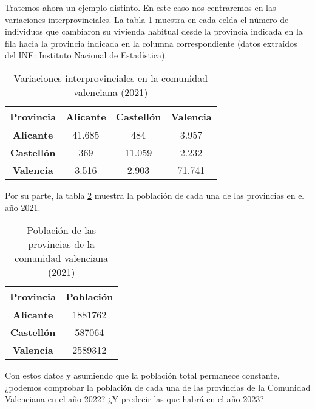 \begin{ejemplo}
    Tratemos ahora un ejemplo distinto. En este caso nos centraremos en las variaciones interprovinciales. La tabla \ref{tab:variaciones} muestra en cada celda el número de individuos que cambiaron su vivienda habitual desde la provincia indicada en la fila hacia la provincia indicada en la columna correspondiente (datos extraídos del INE: Instituto Nacional de Estadística).

    \begin{table}[h]
        \centering
        \begin{tabular}{cccc}\hline
            \textbf{Provincia} & \textbf{Alicante} & \textbf{Castellón} & \textbf{Valencia} \\ \hline\hline
        \textbf{Alicante}                  & 41.685                    & 484                         & 3.957                      \\ \hline
        \textbf{Castellón}                & 369                       & 11.059                      & 2.232                      \\ \hline
        \textbf{Valencia}                & 3.516                     & 2.903                       & 71.741 \\ \hline            
        \end{tabular}
        \caption{Variaciones interprovinciales en la comunidad valenciana (2021)}
        \label{tab:variaciones}
        \end{table}

        Por su parte, la tabla \ref{tab:poblacion} muestra la población de cada una de las provincias en el año 2021. 

        \begin{table}[h]
            \centering
            \begin{tabular}{cc}\hline
                \textbf{Provincia}  & \textbf{Población} \\ \hline\hline
                \textbf{Alicante} &  1881762 \\ \hline
                \textbf{Castellón} & 587064 \\ \hline
                \textbf{Valencia} & 2589312 \\ \hline
            \end{tabular}
            \caption{Población de las provincias de la comunidad valenciana (2021)}
            \label{tab:poblacion}
        \end{table}

        Con estos datos y asumiendo que la población total permanece constante, ¿podemos comprobar la población de cada una de las provincias de la Comunidad Valenciana en el año 2022? ¿Y predecir las que habrá en el año 2023?


\end{ejemplo}
